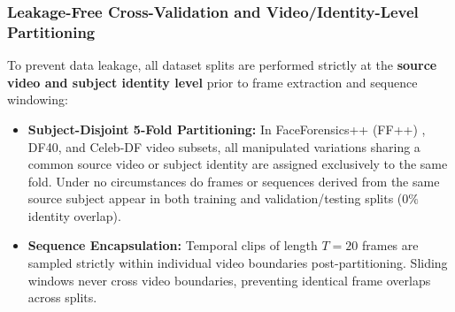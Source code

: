 \begin{table}[ht]
    \centering
    \caption{Summary of Deepfake Generator Paradigms in DF40 \citep{Yan2024DF40}}
    \label{tab:df40_methods}
    \par{}
\end{table}

\subsubsection{Leakage-Free Cross-Validation and Video/Identity-Level Partitioning}
To prevent data leakage, all dataset splits are performed strictly at the \textbf{source video and subject identity level} prior to frame extraction and sequence windowing:
\begin{itemize}
    \item \textbf{Subject-Disjoint 5-Fold Partitioning:} In FaceForensics++ (FF++) \citep{roessler2019faceforensicspp}, DF40, and Celeb-DF \citep{Celeb_DF_cvpr20} video subsets, all manipulated variations sharing a common source video or subject identity are assigned exclusively to the same fold. Under no circumstances do frames or sequences derived from the same source subject appear in both training and validation/testing splits ($0\%$ identity overlap).
    \item \textbf{Sequence Encapsulation:} Temporal clips of length $T=20$ frames are sampled strictly within individual video boundaries post-partitioning. Sliding windows never cross video boundaries, preventing identical frame overlaps across splits.
\end{itemize}

